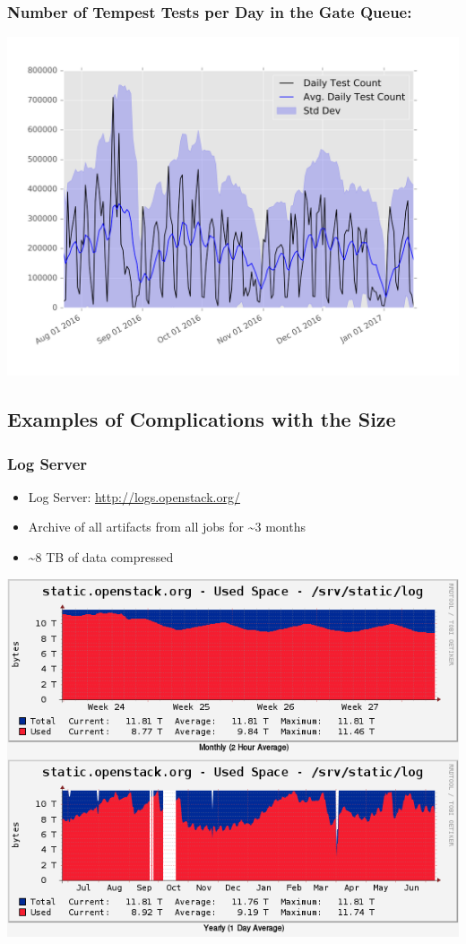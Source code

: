 \documentclass[aspectratio=169,11pt,hyperref={colorlinks=true}]{beamer}
\begin{document}
\begin{frame}
      \frametitle{Number of Tempest Tests per Day in the Gate Queue:}
    \begin{center}
      \includegraphics[width=.8\textwidth]{tempest-gate-count.png}
  \end{center}
\end{frame}

\subsection{Examples of Complications with the Size}
\begin{frame}
  \frametitle{Log Server}
  \begin{itemize}
    \item Log Server: \href{http://logs.openstack.org/}{http://logs.openstack.org/}
    \item Archive of all artifacts from all jobs for \textasciitilde3 months
    \item \textasciitilde8 TB of data compressed
  \end{itemize}
  \begin{center}
    \includegraphics[width=.55\textwidth]{cacti-static-openstack-org-log-graph.png}
  \end{center}
\end{frame}
\end{document}
